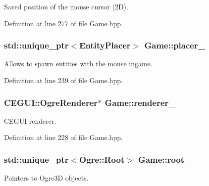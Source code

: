 Saved position of the mouse cursor (2D). 



Definition at line 277 of file Game.\+hpp.

\subsubsection[{\texorpdfstring{placer\+\_\+}{placer_}}]{\setlength{\rightskip}{0pt plus 5cm}std\+::unique\+\_\+ptr$<${\bf Entity\+Placer}$>$ Game\+::placer\+\_\+\hspace{0.3cm}{\ttfamily [private]}}\hypertarget{class_game_a9ce203f7a53ba536a1d7653f7e74d05f}{}\label{class_game_a9ce203f7a53ba536a1d7653f7e74d05f}


Allows to spawn entities with the mouse ingame. 



Definition at line 239 of file Game.\+hpp.

\subsubsection[{\texorpdfstring{renderer\+\_\+}{renderer_}}]{\setlength{\rightskip}{0pt plus 5cm}C\+E\+G\+U\+I\+::\+Ogre\+Renderer$\ast$ Game\+::renderer\+\_\+\hspace{0.3cm}{\ttfamily [private]}}\hypertarget{class_game_a55d453a75a2abc8a0b2ba4ad6265b8c3}{}\label{class_game_a55d453a75a2abc8a0b2ba4ad6265b8c3}


C\+E\+G\+UI renderer. 



Definition at line 228 of file Game.\+hpp.

\subsubsection[{\texorpdfstring{root\+\_\+}{root_}}]{\setlength{\rightskip}{0pt plus 5cm}std\+::unique\+\_\+ptr$<$Ogre\+::\+Root$>$ Game\+::root\+\_\+\hspace{0.3cm}{\ttfamily [private]}}\hypertarget{class_game_ac427345eb3f0b4aa9a6a4a29a195cc61}{}\label{class_game_ac427345eb3f0b4aa9a6a4a29a195cc61}


Pointers to Ogre3D objects. 



